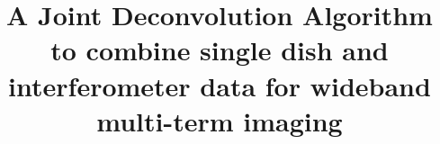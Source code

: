 \documentclass[twocolumn]{aastex61}
\begin{document}
\title{A Joint Deconvolution Algorithm to combine single dish and
interferometer data for wideband multi-term imaging}


\end{document}
